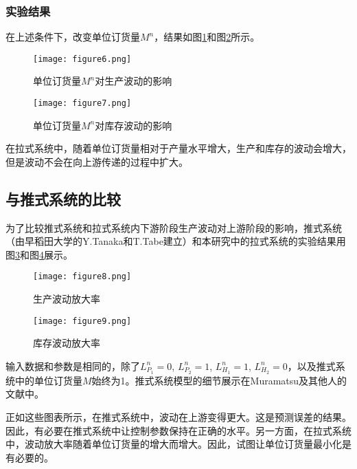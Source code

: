 \subsubsection{实验结果}

在上述条件下，改变单位订货量$M^n$，结果如图\ref{fig:influence-M-P}和图\ref{fig:influence-M-I}所示。

\begin{figure}[htbp]
\centering
\texttt{[image: figure6.png]}
\caption{单位订货量$M^n$对生产波动的影响}
\label{fig:influence-M-P}
\end{figure}

\begin{figure}[htbp]
\centering
\texttt{[image: figure7.png]}
\caption{单位订货量$M^n$对库存波动的影响}
\label{fig:influence-M-I}
\end{figure}

在拉式系统中，随着单位订货量相对于产量水平增大，生产和库存的波动会增大，但是波动不会在向上游传递的过程中扩大。

\subsection{与推式系统的比较}

为了比较推式系统和拉式系统内下游阶段生产波动对上游阶段的影响，推式系统（由早稻田大学的Y.Tanaka和T.Tabe建立）和本研究中的拉式系统的实验结果用图\ref{fig:amp-P}和图\ref{fig:amp-I}展示。

\begin{figure}[htbp]
\centering
\texttt{[image: figure8.png]}
\caption{生产波动放大率}
\label{fig:amp-P}
\end{figure}

\begin{figure}[htbp]
\centering
\texttt{[image: figure9.png]}
\caption{库存波动放大率}
\label{fig:amp-I}
\end{figure}

输入数据和参数是相同的，除了$L_{P_1}^n=0$, $L_{P_2}^n=1$, $L_{H_1}^n=1$, $L_{H_2}^n=0$，以及推式系统中的单位订货量$M$始终为1。推式系统模型的细节展示在Muramatsu及其他人的文献中。

正如这些图表所示，在推式系统中，波动在上游变得更大。这是预测误差的结果。因此，有必要在推式系统中让控制参数保持在正确的水平。另一方面，在拉式系统中，波动放大率随着单位订货量的增大而增大。因此，试图让单位订货量最小化是有必要的。




